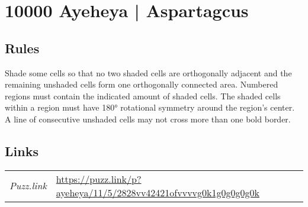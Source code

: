 \section{10000 Ayeheya | {\normalfont Aspartagcus}}
\label{sec:55-10000-ayeheya-aspartagcus}

\subsection*{Rules}
\begin{markdown}
Shade some cells so that no two shaded cells are orthogonally adjacent and the remaining unshaded cells form one orthogonally connected area. Numbered regions must contain the indicated amount of shaded cells. The shaded cells within a region must have 180° rotational symmetry around the region’s center. A line of consecutive unshaded cells may not cross more than one bold border.
\end{markdown}
\subsection*{Links}
\begin{tabularx}{\textwidth}{l X}
\emph{Puzz.link} & \url{https://puzz.link/p?ayeheya/11/5/2828vv42421ofvvvvg0k1g0g0g0g0k} \\
\end{tabularx}
\pagebreak
